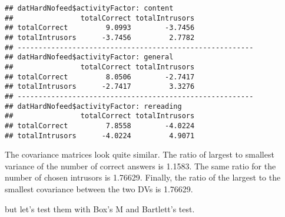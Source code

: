 \documentclass[12pt,]{article}
\begin{document}
\begin{verbatim}
## datHardNofeed$activityFactor: content
##                totalCorrect totalIntrusors
## totalCorrect         9.0993        -3.7456
## totalIntrusors      -3.7456         2.7782
## -------------------------------------------------------- 
## datHardNofeed$activityFactor: general
##                totalCorrect totalIntrusors
## totalCorrect         8.0506        -2.7417
## totalIntrusors      -2.7417         3.3276
## -------------------------------------------------------- 
## datHardNofeed$activityFactor: rereading
##                totalCorrect totalIntrusors
## totalCorrect         7.8558        -4.0224
## totalIntrusors      -4.0224         4.9071
\end{verbatim}

The covariance matrices look quite similar. The ratio of largest to
smallest variance of the number of correct answers is 1.1583. The same
ratio for the number of chosen intrusors is 1.76629. Finally, the ratio
of the largest to the smallest covariance between the two DVs is
1.76629.

but let's test them with Box's M and Bartlett's test.
\end{document}
